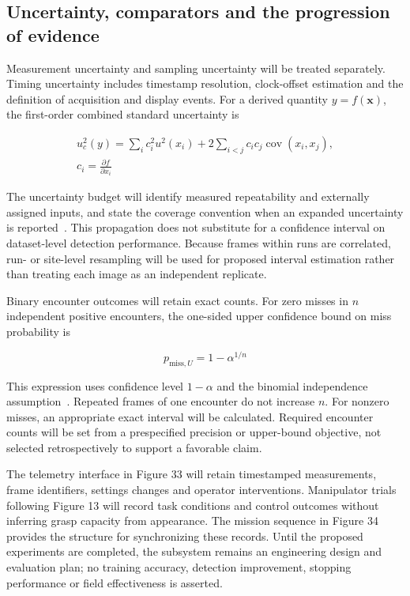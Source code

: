 \documentclass[11pt,letterpaper]{article}
\begin{document}
\subsection{Uncertainty, comparators and the progression of evidence}

Measurement uncertainty and sampling uncertainty will be treated separately. Timing uncertainty includes timestamp resolution, clock-offset estimation and the definition of acquisition and display events. For a derived quantity \(y=f(\mathbf{x})\), the first-order combined standard uncertainty is

\begin{equation}
\begin{gathered}u_c^2(y)=\sum_i c_i^2u^2(x_i)
+2\sum_{i<j}c_i c_j\operatorname{cov}(x_i,x_j),
\\ c_i=\frac{\partial f}{\partial x_i}\end{gathered}
\label{eq:33}
\end{equation}

The uncertainty budget will identify measured repeatability and externally assigned inputs, and state the coverage convention when an expanded uncertainty is reported~\cite{ENG_GUM}. This propagation does not substitute for a confidence interval on dataset-level detection performance. Because frames within runs are correlated, run- or site-level resampling will be used for proposed interval estimation rather than treating each image as an independent replicate.

Binary encounter outcomes will retain exact counts. For zero misses in \(n\) independent positive encounters, the one-sided upper confidence bound on miss probability is

\begin{equation}
p_{\mathrm{miss},U}=1-\alpha^{1/n}
\label{eq:34}
\end{equation}

This expression uses confidence level \(1-\alpha\) and the binomial independence assumption~\cite{ENG_BINOM}. Repeated frames of one encounter do not increase \(n\). For nonzero misses, an appropriate exact interval will be calculated. Required encounter counts will be set from a prespecified precision or upper-bound objective, not selected retrospectively to support a favorable claim.

The telemetry interface in Figure 33 will retain timestamped measurements, frame identifiers, settings changes and operator interventions. Manipulator trials following Figure 13 will record task conditions and control outcomes without inferring grasp capacity from appearance. The mission sequence in Figure 34 provides the structure for synchronizing these records. Until the proposed experiments are completed, the subsystem remains an engineering design and evaluation plan; no training accuracy, detection improvement, stopping performance or field effectiveness is asserted.
\end{document}
